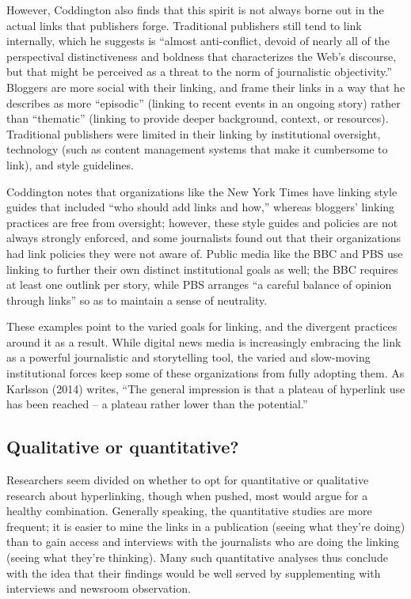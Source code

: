 However, Coddington also finds that this spirit is not always borne out in the actual links that publishers forge. Traditional publishers still tend to link internally, which he suggests is ``almost anti-conflict, devoid of nearly all of the perspectival distinctiveness and boldness that characterizes the Web's discourse, but that might be perceived as a threat to the norm of journalistic objectivity.''\autocite{coddington_building_2012} Bloggers are more social with their linking, and frame their links in a way that he describes as more ``episodic'' (linking to recent events in an ongoing story) rather than ``thematic'' (linking to provide deeper background, context, or resources). Traditional publishers were limited in their linking by institutional oversight, technology (such as content management systems that make it cumbersome to link), and style guidelines.

Coddington notes that organizations like the New York Times have linking style guides that included ``who should add links and how,'' whereas bloggers' linking practices are free from oversight; however, these style guides and policies are not always strongly enforced, and some journalists found out that their organizations had link policies they were not aware of. Public media like the BBC and PBS use linking to further their own distinct institutional goals as well; the BBC requires at least one outlink per story, while PBS arranges ``a careful balance of opinion through links'' so as to maintain a sense of neutrality.\autocite{coddington_normalizing_2013, bbc_putting_2010}

These examples point to the varied goals for linking, and the divergent practices around it as a result. While digital news media is increasingly embracing the link as a powerful journalistic and storytelling tool, the varied and slow-moving institutional forces keep some of these organizations from fully adopting them. As Karlsson (2014) writes, ``The general impression is that a plateau of hyperlink use has been reached -- a plateau rather lower than the potential.''\autocite{karlsson_hyperlinking_2014}

\subsection{Qualitative or quantitative?}

Researchers seem divided on whether to opt for quantitative or qualitative research about hyperlinking, though when pushed, most would argue for a healthy combination. Generally speaking, the quantitative studies are more frequent; it is easier to mine the links in a publication (seeing what they're doing) than to gain access and interviews with the journalists who are doing the linking (seeing what they're thinking). Many such quantitative analyses thus conclude with the idea that their findings would be well served by supplementing with interviews and newsroom observation.

